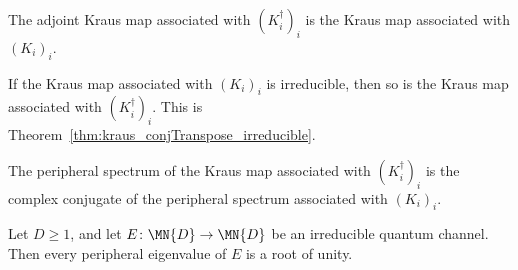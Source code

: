 \begin{theorem}%
    \label{thm:adjoint_map_conjtranspose_family}
    \leanok
    The adjoint Kraus map associated with $(K_i^\dagger)_i$ is the Kraus map
    associated with $(K_i)_i$.
\end{theorem}

\begin{theorem}%
    \label{thm:irreducible_conjtranspose_family}
    \leanok
    If the Kraus map associated with $(K_i)_i$ is irreducible, then so is the
    Kraus map associated with $(K_i^\dagger)_i$. This is
    Theorem~\ref{thm:kraus_conjTranspose_irreducible}.
\end{theorem}

\begin{theorem}%
    \label{thm:peripheral_conjtranspose_family}
    \leanok
    The peripheral spectrum of the Kraus map associated with $(K_i^\dagger)_i$
    is the complex conjugate of the peripheral spectrum associated with
    $(K_i)_i$.
\end{theorem}

\begin{theorem}%
    \label{thm:peripheral_roots_irreducible_channel}
    \leanok
    Let $D\geq1$, and let $E\colon\MN{D}\to\MN{D}$ be an irreducible quantum
    channel. Then every peripheral eigenvalue of $E$ is a root of unity.
\end{theorem}

